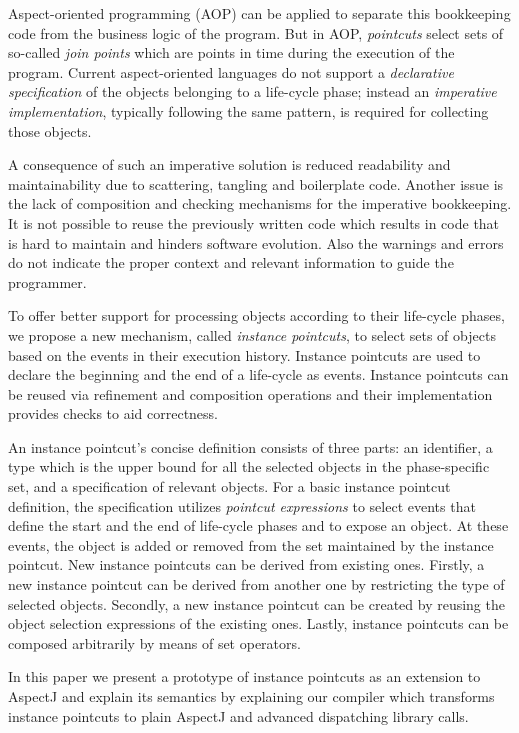 Aspect-oriented programming (AOP) can be applied to separate this bookkeeping code from the business logic of the program. But in AOP, \emph{pointcuts} select sets of so-called \emph{join points} which are points in time during the execution of the program. Current aspect-oriented languages do not support a \emph{declarative specification} of the objects belonging to a life-cycle phase; instead an \emph{imperative implementation}, typically following the same pattern, is required for collecting those objects.

A consequence of such an imperative solution is reduced readability and maintainability due to scattering, tangling and boilerplate code. Another issue is the lack of composition and checking mechanisms for the imperative bookkeeping. It is not possible to reuse the previously written code which results in code that is hard to maintain and hinders software evolution. Also the warnings and errors do not indicate the proper context and relevant information to guide the programmer.


To offer better support for processing objects according to their life-cycle phases, we propose a new mechanism, called \emph{instance pointcuts}, to select sets of objects based on the events in their execution history.
Instance pointcuts are used to declare the beginning and the end of a life-cycle as events. Instance pointcuts can be reused via refinement and composition operations and their implementation provides checks to aid correctness. 

An instance pointcut's concise definition consists of three parts: an identifier, a type which is the upper bound for all the selected objects in the phase-specific set, and a specification of relevant objects.
For a basic instance pointcut definition, the specification utilizes \emph{pointcut expressions} to select events that define the start and the end of life-cycle phases and to expose an object. At these events, the object is added or removed from the set maintained by the instance pointcut. 
New instance pointcuts can be derived from existing ones. Firstly, a new instance pointcut can be derived from another one by restricting the type of selected objects. 
Secondly, a new instance pointcut can be created by reusing the object selection expressions of the existing ones.
Lastly, instance pointcuts can be composed arbitrarily by means of set operators. 

In this paper we present a prototype of instance pointcuts as an extension to AspectJ \cite{kiczales2001overview} and explain its semantics by explaining our compiler which transforms instance pointcuts to plain AspectJ and advanced dispatching library calls. 

